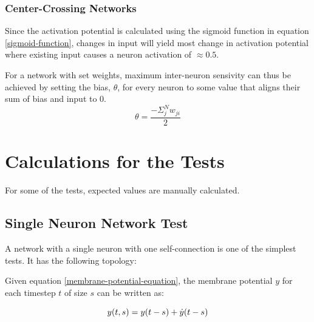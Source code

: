 \documentclass[a4paper]{article}
\begin{document}
\subsubsection{Center-Crossing Networks}
Since the activation potential is calculated using the sigmoid function in equation \ref{sigmoid-function}, changes in input will yield most change in activation potential where existing input causes a neuron activation of $\approx 0.5$.

For a network with set weights, maximum inter-neuron sensivity can thus be achieved by setting the bias, $\theta$, for every neuron to some value that aligns their sum of bias and input to 0.
\begin{equation}
  \theta = \frac{-\Sigma_j^N{w_{ji}}}{2}
\end{equation}

\section{Calculations for the Tests}
For some of the tests, expected values are manually calculated.

\subsection{Single Neuron Network Test}
A network with a single neuron with one self-connection is one of the simplest tests. It has the following topology:\par
\begin{figure}[h]
  \centering
  \par
\end{figure}
Given equation \ref{membrane-potential-equation}, the membrane potential $y$ for each timestep $t$ of size $s$ can be written as:\par

\begin{equation}
  \footnotesize
  y(t,s) = y(t-s) + \dot{y}(t-s)
\end{equation}
\end{document}
